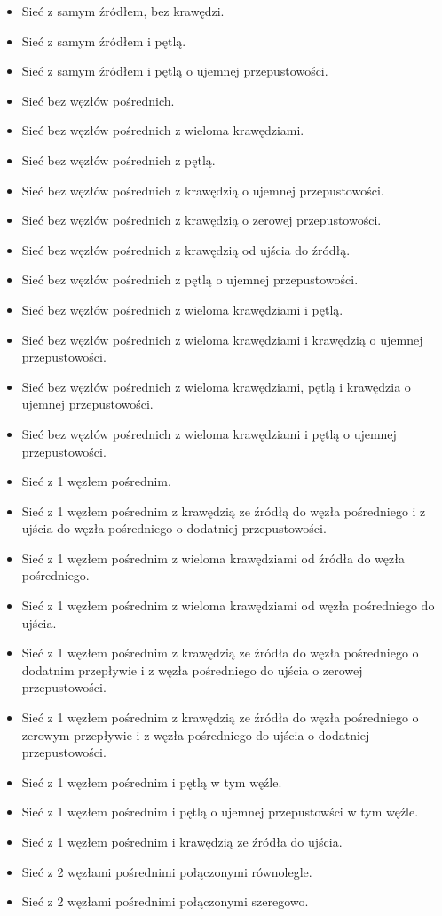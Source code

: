 \documentclass[10pt]{dokument-tiwo}
\begin{document}
    \begin{itemize}
    \item Sieć z samym źródłem, bez krawędzi.
    \item Sieć z samym źródłem i pętlą.
    \item Sieć z samym źródłem i pętlą o ujemnej przepustowości.


    \item Sieć bez węzłów pośrednich.
    \item Sieć bez węzłów pośrednich z wieloma krawędziami.
    \item Sieć bez węzłów pośrednich z pętlą.
    \item Sieć bez węzłów pośrednich z krawędzią o ujemnej przepustowości.
    \item Sieć bez węzłów pośrednich z krawędzią o zerowej przepustowości.
    \item Sieć bez węzłów pośrednich z krawędzią od ujścia do źródłą.
    \item Sieć bez węzłów pośrednich z pętlą o ujemnej przepustowości.
    \item Sieć bez węzłów pośrednich z wieloma krawędziami i pętlą.
    \item Sieć bez węzłów pośrednich z wieloma krawędziami i krawędzią o ujemnej przepustowości.
    \item Sieć bez węzłów pośrednich z wieloma krawędziami, pętlą i krawędzia o ujemnej przepustowości.
    \item Sieć bez węzłów pośrednich z wieloma krawędziami i pętlą o ujemnej przepustowości.   
 

    \item Sieć z 1 węzłem pośrednim.
    \item Sieć z 1 węzłem pośrednim z krawędzią ze źródłą do węzła pośredniego i z ujścia do węzła pośredniego o dodatniej przepustowości.
    \item Sieć z 1 węzłem pośrednim z wieloma krawędziami od źródła do węzła pośredniego.
    \item Sieć z 1 węzłem pośrednim z wieloma krawędziami od węzła pośredniego do ujścia.
    \item Sieć z 1 węzłem pośrednim z krawędzią ze źródła do węzła pośredniego o dodatnim przepływie i z węzła pośredniego do ujścia o zerowej przepustowości.
    \item Sieć z 1 węzłem pośrednim z krawędzią ze źródła do węzła pośredniego o zerowym przepływie i z węzła pośredniego do ujścia o dodatniej przepustowości.
    \item Sieć z 1 węzłem pośrednim i pętlą w tym węźle.
    \item Sieć z 1 węzłem pośrednim i pętlą o ujemnej przepustowści w tym węźle.
    \item Sieć z 1 węzłem pośrednim i krawędzią ze źródła do ujścia.


    \item Sieć z 2 węzłami pośrednimi połączonymi równolegle.


    \item Sieć z 2 węzłami pośrednimi połączonymi szeregowo.
    \end{itemize}
\end{document}
